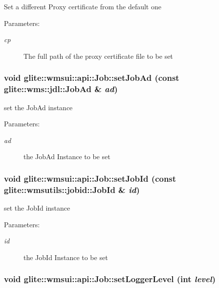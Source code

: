 Set a different Proxy certificate from the default one \begin{Desc}
\item[Parameters:]
\begin{description}
\item[{\em cp}]The full path of the proxy certificate file to be set \end{description}
\end{Desc}
\hypertarget{classglite_1_1wmsui_1_1api_1_1Job_z17_5}{
\subsubsection[setJobAd]{\setlength{\rightskip}{0pt plus 5cm}void glite::wmsui::api::Job::set\-Job\-Ad (const glite::wms::jdl::Job\-Ad \& {\em ad})}}
\label{classglite_1_1wmsui_1_1api_1_1Job_z17_5}


set the Job\-Ad instance \begin{Desc}
\item[Parameters:]
\begin{description}
\item[{\em ad}]the Job\-Ad Instance to be set \end{description}
\end{Desc}
\hypertarget{classglite_1_1wmsui_1_1api_1_1Job_z17_6}{
\subsubsection[setJobId]{\setlength{\rightskip}{0pt plus 5cm}void glite::wmsui::api::Job::set\-Job\-Id (const glite::wmsutils::jobid::Job\-Id \& {\em id})}}
\label{classglite_1_1wmsui_1_1api_1_1Job_z17_6}


set the Job\-Id instance \begin{Desc}
\item[Parameters:]
\begin{description}
\item[{\em id}]the Job\-Id Instance to be set \end{description}
\end{Desc}
\hypertarget{classglite_1_1wmsui_1_1api_1_1Job_z17_4}{
\subsubsection[setLoggerLevel]{\setlength{\rightskip}{0pt plus 5cm}void glite::wmsui::api::Job::set\-Logger\-Level (int {\em level})}}
\label{classglite_1_1wmsui_1_1api_1_1Job_z17_4}


